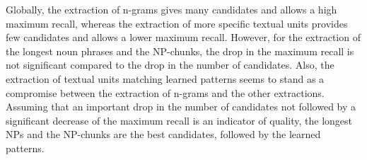       Globally, the extraction  of n-grams gives many candidates and allows a
      high maximum recall, whereas the extraction of more specific textual units
      provides few candidates and allows a lower maximum recall. However, for
      the extraction of the longest noun phrases and the NP-chunks, the drop in
      the maximum recall is not significant compared to the drop in the number
      of candidates. Also, the extraction of textual units matching learned
      patterns seems to stand as a compromise between the extraction of n-grams
      and the other extractions. Assuming that an important drop in the number
      of candidates not followed by a significant decrease of the maximum recall
      is an indicator of quality, the longest NPs and the NP-chunks are the best
      candidates, followed by the learned patterns.

